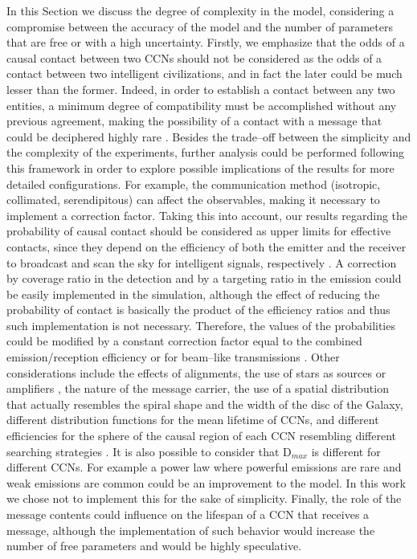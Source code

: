 \documentclass[crop]{CSLB}
\newcommand{\ceti}{CCN}
\newcommand{\cetis}{CCNs}
\begin{document}
In this Section we discuss the degree of complexity in the model,
considering a compromise between the accuracy of the model and the
number of parameters that are free or with a high uncertainty.
%
Firstly, we emphasize that the odds of a causal contact between two
\cetis{} should not be considered as the odds of a contact between two
intelligent civilizations, and in fact the later could be much lesser
than the former.
%
Indeed, in order to establish a contact between any two entities, a
minimum degree of compatibility must be accomplished without any
previous agreement, making the possibility of a contact with a message
that could be deciphered highly rare \citep[see e.g. ][]{forgan_collimated_2014}.
%
Besides the trade--off between the simplicity and the complexity of
the experiments, further analysis could be performed following this
framework in order to explore possible implications of the results for
more detailed configurations.
%
For example, the communication method (isotropic, collimated,
serendipitous) can affect the observables, making it necessary to
implement a correction factor.
%
Taking this into account, our results regarding the probability of
causal contact should be considered as upper limits for effective
contacts, since they depend on the efficiency of both the emitter and
the receiver to broadcast and scan the sky for intelligent signals,
respectively \citep{grimaldi_signal_2017}.
%
A correction by coverage ratio in the detection and by a targeting
ratio in the emission could be easily implemented in the simulation,
although the effect of reducing the probability of contact is
basically the product of the efficiency ratios and thus such
implementation is not necessary.
%
Therefore, the values of the probabilities could be modified by a
constant correction factor equal to the combined emission/reception
efficiency \citep{smith_broadcasting_2009, anchordoqui_upper_2019,
forgan_collimated_2014} or for beam--like transmissions
\citep{grimaldi_signal_2017}.
%
Other considerations include the effects of alignments, the use of
stars as sources or amplifiers \citep{Edmondson2003, borra_searching_2012}, 
the nature of the message carrier, the
use of a spatial distribution that actually resembles the spiral shape
and the width of the disc of the Galaxy, different distribution
functions for the mean lifetime of \cetis{}, and different
efficiencies for the sphere of the causal region of each \ceti{}
resembling different searching strategies
\citep{hippke_interstellar_2017}.
%
It is also possible to consider that D$_{max}$ is different for
different \cetis{}.  For example a power law where powerful emissions
are rare and weak emissions are common could be an improvement to the
model.
%
In this work we chose not to implement this for the sake of
simplicity.
%
Finally, the role of the message contents could influence on the
lifespan of a \ceti{} that receives a message, although the
implementation of such behavior would increase the number of free
parameters and would be highly speculative.
\end{document}
